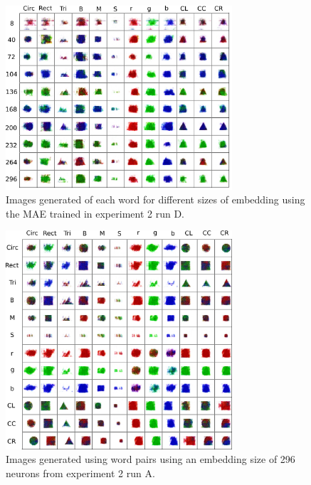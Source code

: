 \begin{figure}
\centering
\includegraphics[width=0.75\textwidth]{Figs/shapes/singlelabel333D.png}
\caption{Images generated of each word for different sizes of embedding using the MAE trained in experiment 2 run D.}
\label{fig:333singleD}
\end{figure}

\begin{figure}
\centering
\includegraphics[width=0.75\textwidth]{Figs/shapes/2word333A.png}
\caption{Images generated using word pairs using an embedding size of 296 neurons from experiment 2 run A.}
\label{fig:2word333A}
\end{figure}

